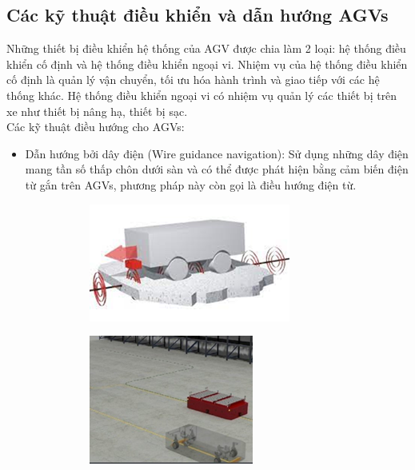     \subsection{Các kỹ thuật điều khiển và dẫn hướng AGVs}
    \hspace*{0.6cm} Những thiết bị điều khiển hệ thống của AGV được chia làm 2 loại: hệ thống điều khiển cố định và hệ thống điều khiển ngoại vi. 
    Nhiệm vụ của hệ thống điều khiển cố định là quản lý vận chuyển, tối ưu hóa hành trình và giao tiếp với các hệ thống khác. Hệ thống điều khiển
    ngoại vi có nhiệm vụ quản lý các thiết bị trên xe như thiết bị nâng hạ, thiết bị sạc. \\
    \hspace*{0.6cm} Các kỹ thuật điều hướng cho AGVs:
    \begin{itemize}
        \item Dẫn hướng bởi dây điện (Wire guidance navigation): Sử dụng những dây điện mang tần số thấp chôn dưới sàn và có thể được phát 
        hiện bằng cảm biến điện từ gắn trên AGVs, phương pháp này còn gọi là điều hướng điện từ.
            \begin{figure}[H]
                \begin{subfigure}{0.5\textwidth}
                \centering
                \includegraphics[width=0.6\linewidth, right]{pictures/chapter1/chapter1_pic_5a.png} 
                \label{chap1_pic5a}
                \end{subfigure}
                \begin{subfigure}{0.5\textwidth}
                \includegraphics[width=0.5\linewidth]{pictures/chapter1/chapter1_pic_5b.png}

\end{subfigure}
\end{figure}
\end{itemize}
